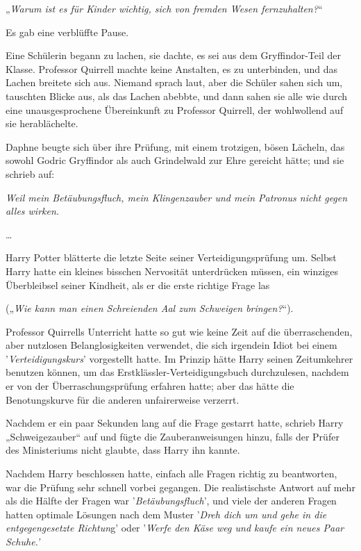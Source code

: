 {„\emph{Warum ist es für Kinder wichtig, sich von fremden Wesen fernzuhalten?}“

Es gab eine verblüffte Pause.

Eine Schülerin begann zu lachen, sie dachte, es sei aus dem Gryffindor-Teil der Klasse. Professor Quirrell machte keine Anstalten, es zu unterbinden, und das Lachen breitete sich aus. Niemand sprach laut, aber die Schüler sahen sich um, tauschten Blicke aus, als das Lachen abebbte, und dann sahen sie alle wie durch eine unausgesprochene Übereinkunft zu Professor Quirrell, der wohlwollend auf sie herablächelte.

Daphne beugte sich über ihre Prüfung, mit einem trotzigen, bösen Lächeln, das sowohl Godric Gryffindor als auch Grindelwald zur Ehre gereicht hätte; und sie schrieb auf:

\emph{Weil mein Betäubungsfluch, mein Klingenzauber und mein Patronus nicht gegen alles wirken.}

…

Harry Potter blätterte die letzte Seite seiner Verteidigungsprüfung um. Selbst Harry hatte ein kleines bisschen Nervosität unterdrücken müssen, ein winziges Überbleibsel seiner Kindheit, als er die erste richtige Frage las

(„\emph{Wie kann man einen Schreienden Aal zum Schweigen bringen?}“).

Professor Quirrells Unterricht hatte so gut wie keine Zeit auf die überraschenden, aber nutzlosen Belanglosigkeiten verwendet, die sich irgendein Idiot bei einem '\emph{Verteidigungskurs}' vorgestellt hatte. Im Prinzip hätte Harry seinen Zeitumkehrer benutzen können, um das Erstklässler-Verteidigungsbuch durchzulesen, nachdem er von der Überraschungsprüfung erfahren hatte; aber das hätte die Benotungskurve für die anderen unfairerweise verzerrt.

Nachdem er ein paar Sekunden lang auf die Frage gestarrt hatte, schrieb Harry „Schweigezauber“ auf und fügte die Zauberanweisungen hinzu, falls der Prüfer des Ministeriums nicht glaubte, dass Harry ihn kannte.

Nachdem Harry beschlossen hatte, einfach alle Fragen richtig zu beantworten, war die Prüfung sehr schnell vorbei gegangen. Die realistischste Antwort auf mehr als die Hälfte der Fragen war '\emph{Betäubungsfluch}', und viele der anderen Fragen hatten optimale Lösungen nach dem Muster '\emph{Dreh dich um und gehe in die entgegengesetzte Richtun}g' oder '\emph{Werfe den Käse weg und kaufe ein neues Paar Schuhe.'}

}
